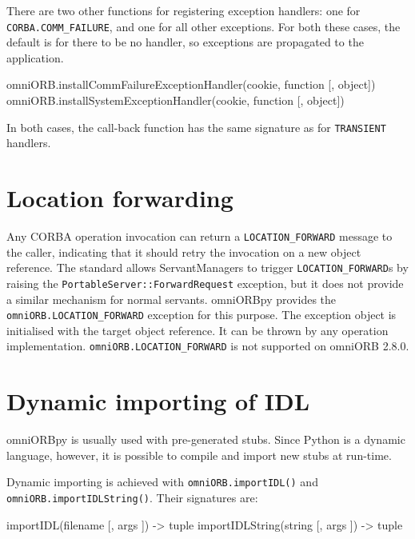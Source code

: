 \documentclass[11pt,twoside,a4paper]{book}
\newcommand{\code}[1]{\texttt{#1}}
\newcommand{\op}[1]{\texttt{#1()}}
\newcommand{\dsc}{\discretionary{}{}{}}
\begin{document}
There are two other functions for registering exception handlers: one
for \code{CORBA.\dsc{}COMM\_FAILURE}, and one for all other
exceptions. For both these cases, the default is for there to be no
handler, so exceptions are propagated to the application.

\begin{pylisting}
omniORB.installCommFailureExceptionHandler(cookie, function [, object])
omniORB.installSystemExceptionHandler(cookie, function [, object])
\end{pylisting}

\noindent In both cases, the call-back function has the same signature
as for \code{TRANSIENT} handlers.



\section{Location forwarding}
\label{sec:locationForward}

Any CORBA operation invocation can return a \code{LOCATION\_FORWARD}
message to the caller, indicating that it should retry the invocation
on a new object reference. The standard allows ServantManagers to
trigger \code{LOCATION\_FORWARD}s by raising the
\code{PortableServer::ForwardRequest} exception, but it does not
provide a similar mechanism for normal servants. omniORBpy provides
the \code{omniORB.\dsc{}LOCATION\_FORWARD} exception for this
purpose. The exception object is initialised with the target object
reference. It can be thrown by any operation
implementation. \code{omniORB.LOCATION\_FORWARD} is not supported on
omniORB 2.8.0.



\section{Dynamic importing of IDL}
\label{sec:importIDL}

omniORBpy is usually used with pre-generated stubs. Since Python is a
dynamic language, however, it is possible to compile and import new
stubs at run-time.

Dynamic importing is achieved with \op{omniORB.importIDL} and
\op{omniORB.\dsc{}importIDLString}. Their signatures are:

\begin{pylisting}
importIDL(filename [, args ]) -> tuple
importIDLString(string [, args ]) -> tuple
\end{pylisting}
\end{document}

